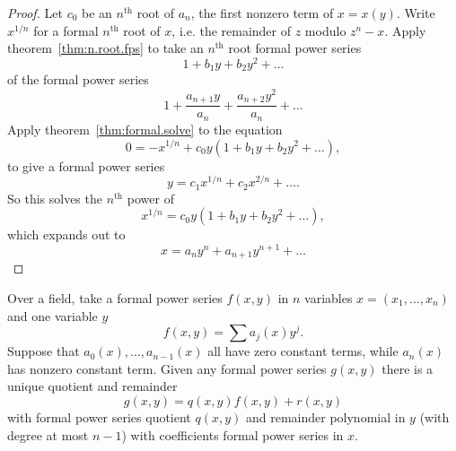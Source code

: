 \begin{proof}
Let \(c_0\) be an \(n^{\text{th}}\) root of \(a_n\), the first nonzero term of \(x=x(y)\).
Write \(x^{1/n}\) for a formal \(n^{\text{th}}\) root of \(x\), i.e. the remainder of \(z\) modulo \(z^n-x\).
Apply theorem~\vref{thm:n.root.fps} to take an \(n^{\text{th}}\) root formal power series
\[
1+b_1y+b_2y^2+\dots
\]
of the formal power series
\[
1+\frac{a_{n+1}y}{a_n}+\frac{a_{n+2}y^2}{a_n}+\dots
\]
Apply theorem~\vref{thm:formal.solve} to the equation
\[
0=-x^{1/n}+c_0y(1+b_1y+b_2y^2+\dots),
\]
to give a formal power series
\[
y=c_1x^{1/n}+c_2x^{2/n}+\dots.
\]
So this solves the \(n^{\text{th}}\) power of 
\[
x^{1/n}=c_0y(1+b_1y+b_2y^2+\dots),
\]
which expands out to
\[
x=a_n y^n + a_{n+1}y^{n+1}+\dots
\]
\end{proof}
\begin{theorem}\label{thm:EA.fps}
Over a field, take a formal power series \(f(x,y)\) in \(n\) variables \(x=(x_1,\dots,x_n)\) and one variable \(y\)
\[
f(x,y)=\sum a_j(x)y^j.
\]
Suppose that \(a_0(x),\dots,a_{n-1}(x)\) all have zero constant terms, while \(a_n(x)\) has nonzero constant term.
Given any formal power series \(g(x,y)\) there is a unique quotient and remainder
\[
g(x,y)=q(x,y)f(x,y)+r(x,y)
\]
with formal power series quotient \(q(x,y)\) and remainder polynomial in \(y\) (with degree at most \(n-1\)) with coefficients formal power series in \(x\).
\end{theorem}

